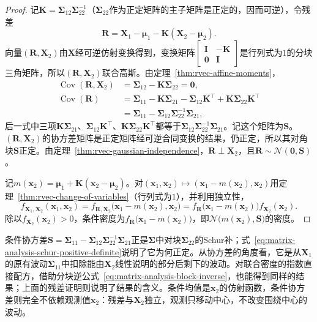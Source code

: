 \begin{proof}
记$\bm K=\bm\Sigma_{12}\bm\Sigma_{22}^{-1}$（$\bm\Sigma_{22}$作为正定矩阵的主子矩阵是正定的，因而可逆），令残差
\[
 \bm R=\bm X_1-\bm\mu_1-\bm K(\bm X_2-\bm\mu_2).
\]
向量$(\bm R,\bm X_2)$由$\bm X$经可逆仿射变换得到，变换矩阵$\begin{bmatrix}\bm I&-\bm K\\\bm0&\bm I\end{bmatrix}$是行列式为$1$的分块三角矩阵，所以$(\bm R,\bm X_2)$联合高斯。由定理~\ref{thm:rvec-affine-moments}，
\[
\begin{aligned}
 \operatorname{Cov}(\bm R,\bm X_2)&=\bm\Sigma_{12}-\bm K\bm\Sigma_{22}=\bm0,\\
 \operatorname{Cov}(\bm R)&=\bm\Sigma_{11}-\bm K\bm\Sigma_{21}-\bm\Sigma_{12}\bm K^{\top}+\bm K\bm\Sigma_{22}\bm K^{\top}\\
 &=\bm\Sigma_{11}-\bm\Sigma_{12}\bm\Sigma_{22}^{-1}\bm\Sigma_{21},
\end{aligned}
\]
后一式中三项$\bm K\bm\Sigma_{21}$、$\bm\Sigma_{12}\bm K^{\top}$、$\bm K\bm\Sigma_{22}\bm K^{\top}$都等于$\bm\Sigma_{12}\bm\Sigma_{22}^{-1}\bm\Sigma_{21}$。记这个矩阵为$\bm S$。$(\bm R,\bm X_2)$的协方差矩阵是正定矩阵经可逆合同变换的结果，仍正定，所以其对角块$\bm S$正定。由定理~\ref{thm:rvec-gaussian-independence}，$\bm R\perp\bm X_2$，且$\bm R\sim\mathcal N(\bm0,\bm S)$。

记$m(\bm x_2)=\bm\mu_1+\bm K(\bm x_2-\bm\mu_2)$。对$(\bm x_1,\bm x_2)\mapsto(\bm x_1-m(\bm x_2),\bm x_2)$用定理~\ref{thm:rvec-change-of-variables}（行列式为$1$），并利用独立性，
\[
 f_{\bm X_1,\bm X_2}(\bm x_1,\bm x_2)=f_{\bm R,\bm X_2}\bigl(\bm x_1-m(\bm x_2),\bm x_2\bigr)=f_{\bm R}\bigl(\bm x_1-m(\bm x_2)\bigr)f_{\bm X_2}(\bm x_2).
\]
除以$f_{\bm X_2}(\bm x_2)>0$，条件密度为$f_{\bm R}\bigl(\bm x_1-m(\bm x_2)\bigr)$，即$\mathcal N\bigl(m(\bm x_2),\bm S\bigr)$的密度。
\end{proof}

条件协方差$\bm S=\bm\Sigma_{11}-\bm\Sigma_{12}\bm\Sigma_{22}^{-1}\bm\Sigma_{21}$正是$\bm\Sigma$中对块$\bm\Sigma_{22}$的Schur补；式~\eqref{eq:matrix-analysis-schur-positive-definite}说明了它为何正定。从协方差的角度看，它是从$\bm X_1$的原有波动$\bm\Sigma_{11}$中扣除能由$\bm X_2$线性说明的部分后剩下的波动。对联合密度的指数直接配方，借助分块逆公式~\eqref{eq:matrix-analysis-block-inverse}，也能得到同样的结果；上面的残差证明则说明了结果的含义。条件均值是$\bm x_2$的仿射函数，条件协方差则完全不依赖观测值$\bm x_2$：残差与$\bm X_2$独立，观测只移动中心，不改变围绕中心的波动。

